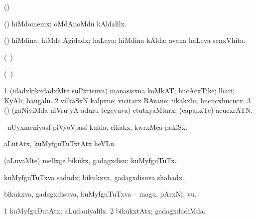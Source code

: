 {{{{{{\bentry
{} 
\gl{\saMavayx}
\expl{}
\bmng
(\pArxparx)  
\emng
\eentry

\bentry
{} 
\gl{\kirxvi}
\expl{}
\bmng
(\pArxparx) hiMdomemx; oMdAnoMdu kAldalilx. 
\emng
\eentry

\bentry
{} 
\gl{\gu}
\expl{}
\bmng
(\pArxparx) hiMdina; hiMde Agidadx; haLeya; hiMdina kAlda:  avana haLeya senxVhita. 
\emng
\eentry

\bentry
{} 
\gl{\kirxvi}
\expl{}
\bmng
(\kanmu\ \birx)  
\emng
\eentry

\bentry
{} 
\gl{\saMavayx}
\expl{}
\bmng
(\kanmu\ \birx)  
\emng
\eentry

\bentry 
{} 
\gl{\nA}
\expl{}
\bmng
\bnum
\num{1} (idadxkikxdadxMte suPxrisuva) manasisxna koMkAT; hucAcxTike; lhari; KyAli; baugalu. 
\num{2} vilkaSxN kalpxne; vicitarx BAvane; tikakxlu; hucucxhucucx. 
\num{3} (\pArxparx) (gaNiyiMda niVru yA aduru tegeyuva) etutxyaMtarx; (capapxTe) acucxrATN. 
\enum
\emng
\eentry

\bentry
{} 
\gl{\nA}
\expl{}
\bmng
\kanmu\ nUyxmeniyasf piVyoVpasf kulda, cikakx, kwrxMca pakiSx. 
\emng
\eentry

\bentry
{} 
\gl{\sakirx}
\expl{}
\bmng
aLutAtx, kuMyfguTuTxtAtx heVLu. 
\emng

\noindent 
\gl{\akirx}
\expl{}
\bmng
(aLuvaMte) mellxge bikukx, gadagxdisu; kuMyfguTuTx. 
\emng
\eentry

\bentry
{} 
\gl{\nA}
\expl{}
\bmng
kuMyfguTuTxva sadudx; bikukxva, gadagxdisuva shabadx. 
\emng
\eentry

\bentry
{} 
\gl{\nA}
\bmng
bikukxva, gadagxdisuva, kuMyfguTuTxva -- magu, pArxNi, \mo vu. 
\emng
\eentry

\bentry
{} 
\gl{\kirxvi}
\expl{}
\bmng
\bnum
\num{1} kuMyfguDutAtx; aLudaniyalilx. 
\num{2} bikukxtAtx; gadagxdadiMda. 
\enum
\emng
\eentry

\bentry
{} 
\gl{\nA}
\bmng
{} 
\emng
\eentry

}}}}}}
